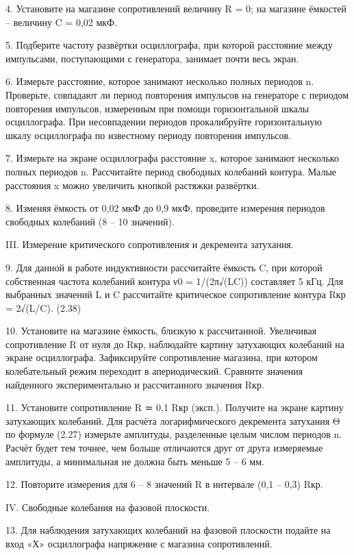 4. Установите на магазине сопротивлений величину R = 0; на магазине
ёмкостей -- величину C = 0,02 мкФ.

5. Подберите частоту развёртки осциллографа, при которой расстояние
между импульсами, поступающими с генератора, занимает почти весь экран.

6. Измерьте расстояние, которое занимают несколько полных периодов n.
Проверьте, совпадают ли период повторения импульсов на генераторе с
периодом повторения импульсов, измеренным при помощи горизонтальной
шкалы осциллографа. При несовпадении периодов прокалибруйте
горизонтальную шкалу осциллографа по известному периоду повторения
импульсов.

7. Измерьте на экране осциллографа расстояние x, которое занимают
несколько полных периодов n. Рассчитайте период свободных колебаний
контура. Малые расстояния x можно увеличить кнопкой растяжки развёртки.

8. Изменяя ёмкость от 0,02 мкФ до 0,9 мкФ, проведите измерения периодов
свободных колебаний (8 -- 10 значений).

III. Измерение критического сопротивления и декремента затухания.

9. Для данной в работе индуктивности рассчитайте ёмкость C, при которой
собственная частота колебаний контура ν0 = 1/(2π√(LC)) составляет 5 кГц.
Для выбранных значений L и C рассчитайте критическое сопротивление
контура Rкр = 2√(L/C). (2.38)

10. Установите на магазине ёмкость, близкую к рассчитанной. Увеличивая
сопротивление R от нуля до Rкр, наблюдайте картину затухающих колебаний
на экране осциллографа. Зафиксируйте сопротивление магазина, при котором
колебательный режим переходит в апериодический. Сравните значения
найденного экспериментально и рассчитанного значения Rкр.

11. Установите сопротивление R ≃ 0,1 Rкр (эксп.). Получите на экране
картину затухающих колебаний. Для расчёта логарифмического декремента
затухания Θ по формуле (2.27) измерьте амплитуды, разделенные целым
числом периодов n. Расчёт будет тем точнее, чем больше отличаются друг
от друга измеряемые амплитуды, а минимальная не должна быть меньше 5 --
6 мм.

12. Повторите измерения для 6 -- 8 значений R в интервале (0,1 -- 0,3)
Rкр.

IV. Свободные колебания на фазовой плоскости.

13. Для наблюдения затухающих колебаний на фазовой плоскости подайте на
вход «Х» осциллографа напряжение с магазина сопротивлений.

